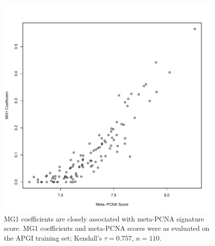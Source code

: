 \documentclass[dissertation.tex]{subfiles}
\begin{document}
\begin{figure}
\centering
\includegraphics[width=.7\linewidth]{analysis/biosurv/reports/18_SIS_diag_dsd_final/figure/metagene-pairs-7}
\caption{MG1 coefficients are closely associated with meta-PCNA signature score.  MG1 coefficients and meta-PCNA \cite{Venet2011} scores were as evaluated on the \gls{APGI} training set; Kendall's $\tau = 0.757$, $n = 110$.\label{fig:sigs-nmf-corplots}}
\end{figure}
\end{document}

